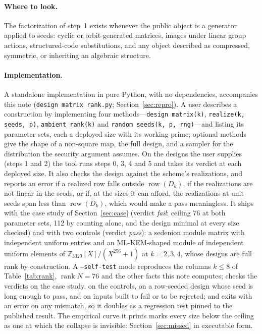 \documentclass[11pt]{article}
\makeatletter
\theoremstyle{remark}
\DeclareMathOperator{\rank}{rank}
\DeclareMathOperator{\row}{row}
\DeclareRobustCommand{\_}{%
  \edef\@tempa{\ttdefault}%
  \ifx\f@family\@tempa\char95 \else\textunderscore\fi\penalty300\relax}
\makeatother
\begin{document}
\paragraph{Where to look.} The factorization of step~1 exists whenever the public object is a generator applied to
seeds: cyclic or orbit-generated matrices, images under linear group actions, structured-code substitutions, and any
object described as compressed, symmetric, or inheriting an algebraic structure.

\paragraph{Implementation.} A standalone implementation in pure Python, with no dependencies, accompanies this note
(\texttt{design\_matrix\_rank.py}; Section~\ref{sec:repro}). A user describes a construction by implementing four
methods---\texttt{design\_matrix(k)}, \texttt{realize(k, seeds, p)}, \texttt{ambient\_rank(k)} and
\texttt{random\_seeds(k, p, rng)}---and listing its parameter sets, each a deployed size with its working prime; optional
methods give the shape of a non-square map, the full design, and a sampler for the distribution the security argument
assumes. On the designs the user supplies (steps 1 and 2) the tool runs steps 0, 3, 4 and 5 and takes its verdict at
each deployed size. It also checks the design against the scheme's realizations, and reports an error if a realized row
falls outside $\row(D_k)$, if the realizations are not linear in the seeds, or if, at the sizes it can afford, the
realizations at unit seeds span less than $\row(D_k)$, which would make a pass meaningless. It ships with the case study
of Section~\ref{sec:case} (verdict \emph{fail}: ceiling 76 at both parameter sets, 112 by counting alone, and the design
minimal at every size checked) and with two controls (verdict \emph{pass}): a sedenion module matrix with independent
uniform entries and an ML-KEM-shaped module of independent uniform elements of $\mathbb{Z}_{3329}[X]/(X^{256}+1)$ at
$k=2,3,4$, whose designs are full rank by construction. A \texttt{--self-test} mode reproduces the columns $k\le8$ of
Table~\ref{tab:rank}, $\rank N=76$ and the other facts this note computes; checks the verdicts on the case study, on the
controls, on a row-seeded design whose seed is long enough to pass, and on inputs built to fail or to be rejected; and
exits with an error on any mismatch, so it doubles as a regression test pinned to the published result. The empirical curve it prints marks every size below the ceiling as one at which the
collapse is invisible: Section~\ref{sec:missed} in executable form.
\end{document}

